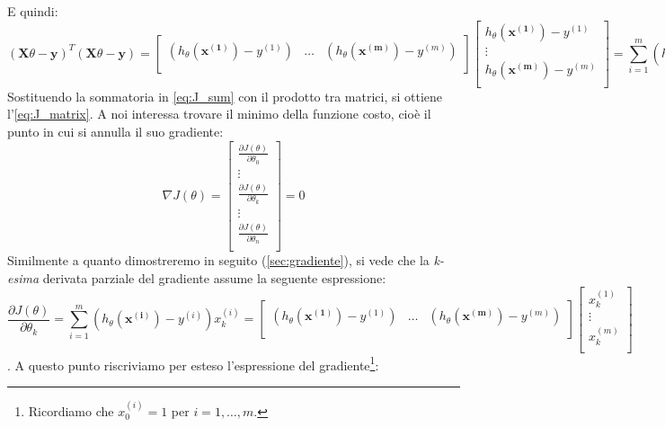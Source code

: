 E quindi:
\begin{dmath*}
(\mathbf{X}\theta - \mathbf{y})^T (\mathbf{X}\theta - \mathbf{y}) = \begin{bmatrix}
 (h_\theta(\mathbf{x^{(1)}}) - y^{(1)}) & 
  \dots &
  (h_\theta(\mathbf{x^{(m)}}) - y^{(m)}) \\
 \end{bmatrix}
 \begin{bmatrix}
 h_\theta(\mathbf{x^{(1)}}) - y^{(1)} \\
  \vdots \\
   h_\theta(\mathbf{x^{(m)}}) - y^{(m)} \\
 \end{bmatrix}
 = \sum_{i=1}^m (h_\theta(\mathbf{x^{(i)}})-y^{(i)})^2.
\end{dmath*}
Sostituendo la sommatoria in \autoref{eq:J_sum} con il prodotto tra matrici, si ottiene l'\autoref{eq:J_matrix}.
A noi interessa trovare il minimo della funzione costo, cioè il punto in cui si annulla il suo gradiente:
\begin{equation*}
\nabla J(\theta) = \begin{bmatrix}
\frac{ \partial J(\theta)}{\partial\theta_0} \\
\vdots \\
\frac{ \partial J(\theta)}{\partial\theta_k} \\
\vdots \\
\frac{ \partial J(\theta)}{\partial\theta_n} \\
 \end{bmatrix}=0
\end{equation*}
Similmente a quanto dimostreremo in seguito (\autoref{sec:gradiente}), si vede che la \emph{k-esima} derivata parziale del gradiente assume la seguente espressione:
\begin{dmath*}
\frac{ \partial J(\theta)}{\partial\theta_k}  = \sum_{i=1}^m (h_\theta(\mathbf{x^{(i)}})-y^{(i)})x_k^{(i)} = \begin{bmatrix}
 (h_\theta(\mathbf{x^{(1)}}) - y^{(1)}) &
  \dots &
  (h_\theta(\mathbf{x^{(m)}}) - y^{(m)}) \\
 \end{bmatrix}
 \begin{bmatrix}
 x^{(1)}_k \\
 \vdots \\
 x^{(m)}_k \\
 \end{bmatrix}
\end{dmath*}.
A questo punto riscriviamo per esteso l'espressione del gradiente\footnote{Ricordiamo che $x_0^{(i)}=1$ per $i=1,\dots,m$.}:
